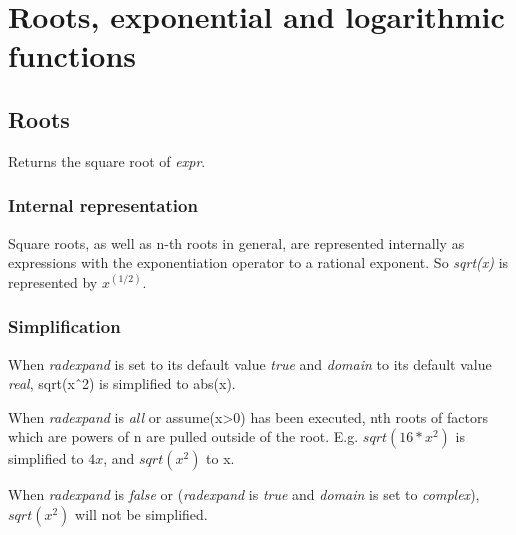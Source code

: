 \documentclass[../Maxima_Workbook.tex]{subfiles}
\begin{document}
\chapter{Roots, exponential and logarithmic functions}

\section{Roots}

\lz {} \hfill \tcr{[function]}

\lz Returns the square root of \emph{expr}.

\subsection{Internal representation}

Square roots, as well as n-th roots in general, are represented internally as expressions with the exponentiation operator to a rational exponent. So \emph{sqrt(x)} is represented by $ x^{(1/2)} $.


\subsection{Simplification}

 \qquad {} \hfill {}

\lz {} \qquad {} \hfill {}

\lz When \emph{radexpand} is set to its default value \emph{true} and \emph{domain} to its default value \emph{real}, sqrt(x\^\ 2) is simplified to abs(x). 

\lz When \emph{radexpand} is \emph{all} or assume(x>0) has been executed, nth roots of factors which are powers of n are pulled outside of the root. E.g. $ sqrt (16*x^2) $ is simplified to $ 4x $, and $ sqrt(x^2) $ to x.

\lz When \emph{radexpand} is \emph{false} or (\emph{radexpand} is \emph{true} and \emph{domain} is set to \emph{complex}), $ sqrt(x^2) $ will not be simplified.

\lzz {} \hfill \tcr{[function]}

\lz {} \qquad {} \hfill {}
\end{document}
